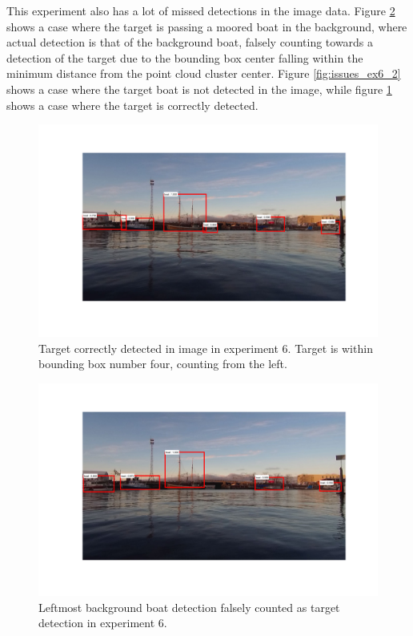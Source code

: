 This experiment also has a lot of missed detections in the image data. Figure \ref{fig:issues_ex6} shows a case where the target is passing a moored boat in the background, where actual detection is that of the background boat, falsely counting towards a detection of the target due to the bounding box center falling within the minimum distance from the point cloud cluster center. Figure \ref{fig:issues_ex6_2} shows a case where the target boat is not detected in the image, while figure \ref{fig:issues_ex6_3} shows a case where the target is correctly detected.
\begin{figure}[!htb]
	\centering
	\includegraphics[width=\linewidth]{fig/ex6_hit.png}
	\caption{Target correctly detected in image in experiment 6. Target is within bounding box number four, counting from the left.}
	\label{fig:issues_ex6_3}
\end{figure}
\begin{figure}[H]
	\centering
	\includegraphics[width=\linewidth]{fig/ex6_false.png}
	\caption{Leftmost background boat detection falsely counted as target detection in experiment 6.}
	\label{fig:issues_ex6}
\end{figure}
